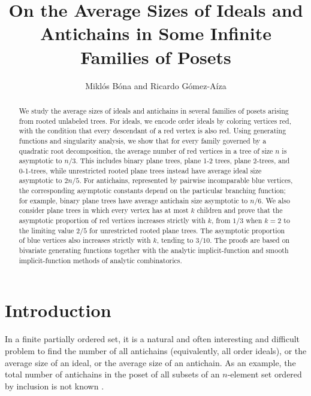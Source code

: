 \documentclass[11pt, onesided]{amsart}
\theoremstyle{remark}
\begin{document}
\title{On the Average Sizes of Ideals and Antichains in Some Infinite Families of Posets}

\author{Mikl\'os B\'ona and Ricardo G\'omez-A\'iza}

\date{}

\maketitle

\begin{abstract}
We study the average sizes of ideals and antichains in several families of posets arising from rooted unlabeled trees. 
For ideals, we encode order ideals by coloring vertices red, with the condition that every descendant of a red vertex is also red. 
Using generating functions and singularity analysis, we show that for every family governed by a quadratic root decomposition, the average number of red vertices in a tree of size $n$ is asymptotic to $n/3$. 
This includes binary plane trees, plane 1-2 trees, plane 2-trees, and 0-1-trees, while unrestricted rooted plane trees instead have average ideal size asymptotic to $2n/5$. 
For antichains, represented by pairwise incomparable blue vertices, the corresponding asymptotic constants depend on the particular branching function; for example, binary plane trees have average antichain size asymptotic to $n/6$. 
We also consider plane trees in which every vertex has at most $k$ children and prove that the asymptotic proportion of red vertices increases strictly with $k$, from $1/3$ when $k=2$ to the limiting value $2/5$ for unrestricted rooted plane trees. 
The asymptotic proportion of blue vertices also increases strictly with $k$, tending to $3/10$.
The proofs are based on bivariate generating functions together with the analytic implicit-function and smooth implicit-function methods of analytic combinatorics.
\end{abstract}

\section{Introduction}
In a finite partially ordered set, it is a natural and often interesting and difficult problem to find the number of all antichains (equivalently, all order ideals), or the average size of an ideal, or the average size of an antichain. As an example, the total number of antichains in the poset of all subsets of an $n$-element set
ordered by inclusion is not known \cite{JenssenMalekshahianPark}.
\end{document}

